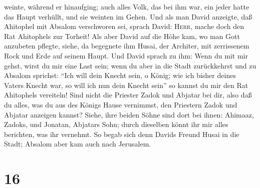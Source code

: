 weinte, während er hinaufging; auch alles Volk, das bei ihm war, ein
jeder hatte das Haupt verhüllt, und sie weinten im Gehen.
 Und als man David anzeigte, daß Ahitophel mit Absalom
verschworen sei, sprach David: \textsc{Herr}, mache doch den Rat
Ahitophels zur Torheit!  Als aber David auf die Höhe kam,
wo man Gott anzubeten pflegte, siehe, da begegnete ihm Husai, der
Architer, mit zerrissenem Rock und Erde auf seinem Haupt.
 Und David sprach zu ihm: Wenn du mit mir gehst, wirst du
mir eine Last sein;  wenn du aber in die Stadt
zurückkehrst und zu Absalom sprichst: ``Ich will dein Knecht sein, o
König; wie ich bisher deines Vaters Knecht war, so will ich nun dein
Knecht sein'' so kannst du mir den Rat Ahitophels vereiteln!
 Sind nicht die Priester Zadok und Abjatar bei dir, also
daß du alles, was du aus des Königs Hause vernimmst, den Priestern Zadok
und Abjatar anzeigen kannst?  Siehe, ihre beiden Söhne
sind dort bei ihnen: Ahimaaz, Zadoks, und Jonatan, Abjatars Sohn; durch
dieselben könnt ihr mir alles berichten, was ihr vernehmt.
 So begab sich denn Davids Freund Husai in die Stadt;
Absalom aber kam auch nach Jerusalem.

\hypertarget{section-15}{%
\section{16}\label{section-15}}

